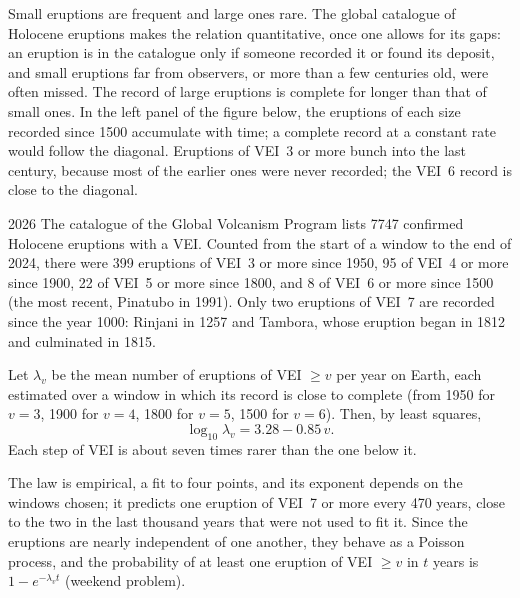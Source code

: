 Small eruptions are frequent and large ones rare. The global catalogue of
Holocene eruptions makes the relation quantitative, once one allows for its
gaps: an eruption is in the catalogue only if someone recorded it or found its
deposit, and small eruptions far from observers, or more than a few centuries
old, were often missed. The record of large eruptions is complete for longer than
that of small ones. In the left panel of the figure below, the eruptions of each
size recorded since 1500 accumulate with time; a complete record at a constant
rate would follow the diagonal. Eruptions of VEI~3 or more bunch into the last
century, because most of the earlier ones were never recorded; the VEI~6 record
is close to the diagonal.

\begin{dated}{2026}
The catalogue of the Global Volcanism Program lists \num{7747} confirmed Holocene
eruptions with a VEI. Counted from the start of a window to the end of 2024, there
were 399 eruptions of VEI~3 or more since 1950, 95 of VEI~4 or more since 1900,
22 of VEI~5 or more since 1800, and 8 of VEI~6 or more since 1500 (the most
recent, Pinatubo in 1991). Only two eruptions of VEI~7 are recorded since the year
1000: Rinjani in 1257 and Tambora, whose eruption began in 1812 and culminated in
1815.
\end{dated}

\begin{proposition}\label{prop:b2:eruptive-styles:frequency}
Let $\lambda_v$ be the mean number of eruptions of VEI $\ge v$ per year on Earth,
each estimated over a window in which its record is close to complete (from 1950
for $v = 3$, 1900 for $v = 4$, 1800 for $v = 5$, 1500 for $v = 6$). Then, by least
squares,
\[
\log_{10}\lambda_v = 3.28 - 0.85\,v .
\]
Each step of VEI is about seven times rarer than the one below it.
\end{proposition}

The law is empirical, a fit to four points, and its exponent depends on the
windows chosen; it predicts one eruption of VEI~7 or more every \num{470} years,
close to the two in the last thousand years that were not used to fit it. Since
the eruptions are nearly independent of one another, they behave as a Poisson
process, and the probability of at least one eruption of VEI $\ge v$ in $t$ years
is $1 - e^{-\lambda_vt}$ (weekend problem).

